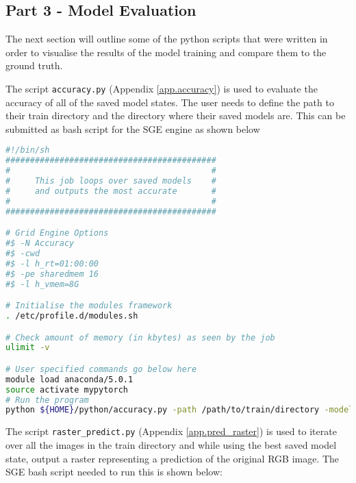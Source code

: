 \subsection*{Part 3 - Model Evaluation}
The next section will outline some of the python scripts that were written in order to visualise the results of the model training and compare them to the ground truth. 
\par
The script \texttt{accuracy.py} (Appendix \ref{app.accuracy}) is used to evaluate the accuracy of all of the saved model states. The user needs to define the path to their train directory and the directory where their saved models are.
This can be submitted as bash script for the SGE engine as shown below
\begin{lstlisting}[language=bash, caption = {Bash script required to submit the \texttt{accuracy.py} script. }, label={lst.bash_accuracy}]
#!/bin/sh
###########################################
#                                         #
#     This job loops over saved models    #
#     and outputs the most accurate       #
#                                         #
###########################################

# Grid Engine Options
#$ -N Accuracy
#$ -cwd
#$ -l h_rt=01:00:00
#$ -pe sharedmem 16
#$ -l h_vmem=8G

# Initialise the modules framework
. /etc/profile.d/modules.sh

# Check amount of memory (in kbytes) as seen by the job
ulimit -v

# User specified commands go below here
module load anaconda/5.0.1
source activate mypytorch
# Run the program
python ${HOME}/python/accuracy.py -path /path/to/train/directory -model /path/to/saved/models/
\end{lstlisting}
\par
The script \texttt{raster\_predict.py} (Appendix \ref{app.pred_raster}) is used to iterate over all the images in the train directory and while using the best saved model state, output a raster representing a prediction of the original RGB image. The SGE bash script needed to run this is shown below:
